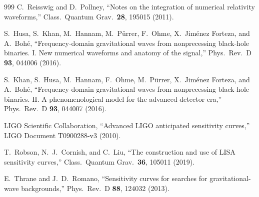 \documentclass[twocolumn,floatfix,aps,prd,superscriptaddress,nofootinbib,showkeys]{revtex4-2}
\begin{document}
\begin{thebibliography}{999}
C.~Reisswig and D.~Pollney,
\newblock ``Notes on the integration of numerical relativity waveforms,''
\newblock Class.\ Quantum Grav.\ \textbf{28}, 195015 (2011).

S.~Husa, S.~Khan, M.~Hannam, M.~P\"urrer, F.~Ohme, X.~Jim\'enez Forteza, and A.~Boh\'e,
\newblock ``Frequency-domain gravitational waves from nonprecessing black-hole binaries. I. New numerical waveforms and anatomy of the signal,''
\newblock Phys.\ Rev.\ D \textbf{93}, 044006 (2016).

S.~Khan, S.~Husa, M.~Hannam, F.~Ohme, M.~P\"urrer, X.~Jim\'enez Forteza, and A.~Boh\'e,
\newblock ``Frequency-domain gravitational waves from nonprecessing black-hole binaries. II. A phenomenological model for the advanced detector era,''
\newblock Phys.\ Rev.\ D \textbf{93}, 044007 (2016).

LIGO Scientific Collaboration,
\newblock ``Advanced LIGO anticipated sensitivity curves,''
\newblock LIGO Document T0900288-v3 (2010).

T.~Robson, N.~J.~Cornish, and C.~Liu,
\newblock ``The construction and use of LISA sensitivity curves,''
\newblock Class.\ Quantum Grav.\ \textbf{36}, 105011 (2019).

E.~Thrane and J.~D.~Romano,
\newblock ``Sensitivity curves for searches for gravitational-wave backgrounds,''
\newblock Phys.\ Rev.\ D \textbf{88}, 124032 (2013).

\end{thebibliography}
\end{document}
